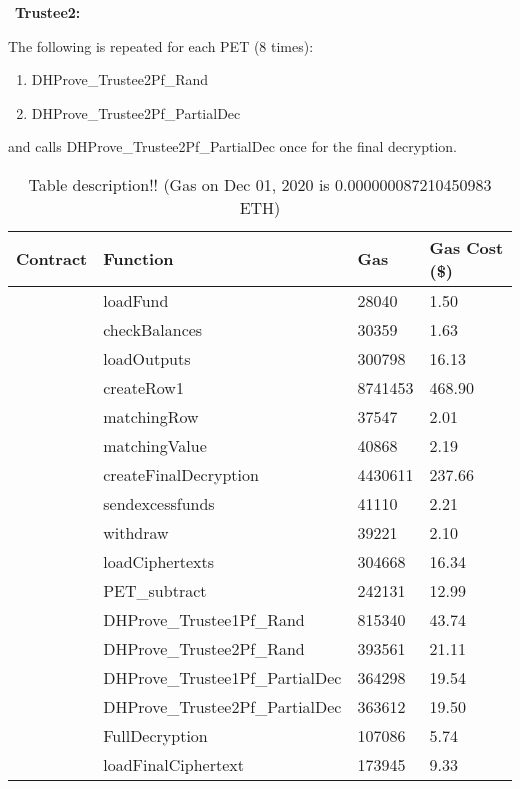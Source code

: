 ~\textbf{Trustee2:} 

The following is repeated for each PET (8 times): 
\begin{enumerate}
	\item DHProve\_Trustee2Pf\_Rand 
	\item DHProve\_Trustee2Pf\_PartialDec
\end{enumerate}
and calls DHProve\_Trustee2Pf\_PartialDec once for the final decryption.


\begin{table}[]
	\begin{tabular}{|l|l|l|l|}
		\hline
		Contract & Function  & Gas  & Gas Cost (\$)  \\ \hline
		\multirow{9}{*}{}  
		& loadFund & 28040  &1.50  \\ \cline{2-4} 
		& checkBalances &  30359& 1.63 \\  \cline{2-4} 
		&  loadOutputs&  300798 & 16.13 \\  \cline{2-4} 
		&  createRow1 & 8741453 & 468.90 \\  \cline{2-4}
		Mixmatch.sol	&  matchingRow & 37547 &2.01  \\  \cline{2-4}
		& matchingValue &  40868&2.19 \\  \cline{2-4}
		&  createFinalDecryption&  4430611& 237.66 \\  \cline{2-4}
		& sendexcessfunds &  41110& 2.21 \\  \cline{2-4}
		& withdraw &  39221& 2.10 \\   \hline
		\multirow{8}{*}{} 
		&  loadCiphertexts & 304668 & 16.34 \\  \cline{2-4}
		& PET\_subtract & 242131 & 12.99\\  \cline{2-4}
		&  DHProve\_Trustee1Pf\_Rand& 815340 &  43.74\\  \cline{2-4}
		PET.sol	&  DHProve\_Trustee2Pf\_Rand& 393561 &21.11  \\  \cline{2-4}
		&  DHProve\_Trustee1Pf\_PartialDec& 364298 & 19.54\\  \cline{2-4}
		& DHProve\_Trustee2Pf\_PartialDec & 363612 & 19.50 \\  \cline{2-4}
		& FullDecryption  &  107086& 5.74 \\  \cline{2-4}
		&  loadFinalCiphertext& 173945 & 9.33\\ \hline
	\end{tabular}
	\caption{Table description!! (Gas on Dec 01, 2020 is 0.000000087210450983 ETH)} \label{tab:gas}
\end{table}


